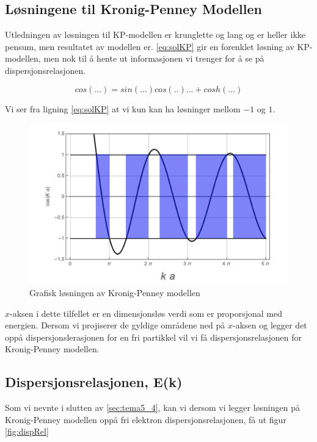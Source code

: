 \subsection{Løsningene til Kronig-Penney Modellen}
\label{sec:tema5_4}
Utledningen av løsningen til KP-modellen er krunglette og lang og er heller ikke pensum, men resultatet av modellen er. \autoref{eq:solKP} gir en forenklet løsning av KP-modellen, men nok til å hente ut informasjonen vi trenger for å se på dispersjonsrelasjonen.

\begin{equation}
    \label{eq:solKP}
    cos(...) = sin(...)cos(..)...+cosh(...)
\end{equation}

Vi ser fra ligning \ref{eq:solKP} at vi kun kan ha løsninger mellom $-1$ og $1$. 

\begin{figure}[!htb]
    \centering
    \includegraphics[scale=0.8]{Bilder/SamtaleTema5/KP-plot.png}
    \caption{Grafisk løsningen av Kronig-Penney modellen }
    \label{fig:plot-kp}
\end{figure}

$x$-aksen i dette tilfellet er en dimensjonsløs verdi som er proporsjonal med energien. Dersom vi projiserer de gyldige områdene ned på $x$-aksen og legger det oppå dispersjonslerasjonen for en fri partikkel vil vi få dispersjonsrelasjonen for Kronig-Penney modellen.

\subsection{Dispersjonsrelasjonen, E(k)}
\label{sec:tema5_5}
Som vi nevnte i slutten av \autoref{sec:tema5_4}, kan vi dersom vi legger løsningen på Kronig-Penney modellen oppå fri elektron dispersjonsrelasjonen, få ut figur \ref{fig:dispRel}

